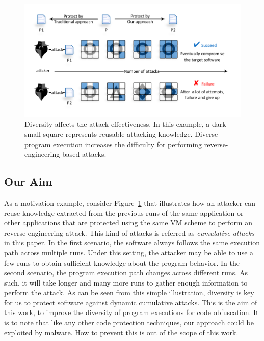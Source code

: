 \begin{figure}[t]%
    \centering
    \includegraphics[width=0.7\columnwidth]{figure/figone.pdf}
    \caption{Diversity affects  the attack effectiveness. In this example, a dark small square represents reusable attacking knowledge. Diverse program execution increases the difficulty for performing reverse-engineering based attacks.}\label{fig:Fig.1}
\end{figure}

\subsection{Our Aim}
As a motivation example, consider Figure~\ref{fig:Fig.1} that illustrates how an attacker
can reuse knowledge extracted from the previous runs of the same application or
other applications that are protected using the same VM scheme to perform an reverse-engineering attack.
This kind of attacks is referred as \emph{cumulative attacks} in this paper.
In the first scenario, the software always follows the same execution path
across multiple runs. Under this setting, the attacker may be able to use a few runs to
obtain sufficient knowledge about the program behavior.
In the second scenario, the program execution path changes across different runs.
As such, it will take longer and many more runs to gather enough information to perform the attack.
As can be seen from this simple illustration, diversity is key for us to protect software against dynamic cumulative attacks.
This is the aim of this work, to improve the diversity of program executions for code obfuscation. 
It is to note that like any other code protection techniques, our approach could be exploited by malware.
How to prevent this is out of the scope of this work. 
